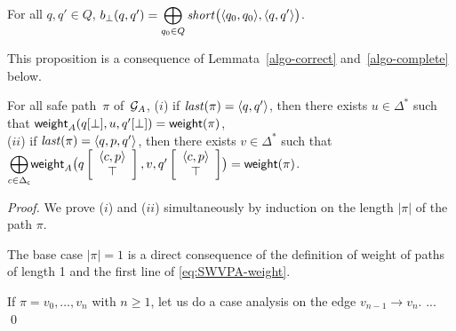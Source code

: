 \begin{proposition}\label{algo-shortest}
For all $q, q' \in Q$, 
$b_\bot(q, q') = \displaystyle\bigoplus_{q_0 \in Q} \mathit{short}\bigl(\< q_0, q_0>, \< q, q'>\bigr)$.
\end{proposition}
This proposition is a consequence of Lemmata~\ref{algo-correct} and~\ref{algo-complete} below.



\begin{lemma}[Correctness]\label{algo-correct}
For all safe path~$\pi$ of~$\mathcal{G}_A$,  %
($i$) if $\last(\pi) = \< q, q'>$, %
then there exists $u \in \Delta^*$ such that 
$\mathsf{weight}_A(q[\bot], u, q'[\bot]) = \mathsf{weight}(\pi)$,\\
%
($ii$) if $\last(\pi) = \< q, p, q'>$, %
then there exists $v \in \Delta^*$ such that \\
${\displaystyle\bigoplus_{c \in \Deltac}}
 \weight_A\bigl(\configup{q}{\< c, p> \stackup \top }, v, \configup{q'}{\<c, p> \stackup \top}\bigr)
 = \weight(\pi)$.
\end{lemma}
%
\begin{proof}
We prove ($i$) and ($ii$) simultaneously by induction on the length $|\pi|$ of the path $\pi$.

\noindent
The base case $|\pi| = 1$ is a direct consequence of the definition of weight of paths of length 1
and the first line of \eqref{eq:SWVPA-weight}.

\noindent
If $\pi = v_0,\ldots, v_n$ with $n \geq 1$, 
let us do a case analysis on the edge $v_{n-1} \to v_n$.
...
\qed
\end{proof}



